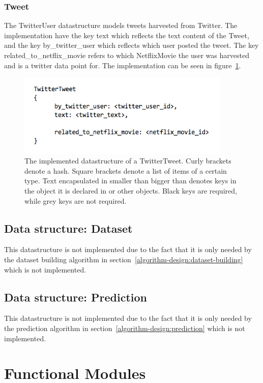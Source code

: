\subsubsection{Tweet}
The TwitterUser datastructure models tweets harvested from Twitter. The implementation have the key text which reflects the text content of the Tweet, and the key by\_twitter\_user which reflects which user posted the tweet. The key related\_to\_netflix\_movie refers to which NetflixMovie the user was harvested and is a twitter data point for. The implementation can be seen in figure~\ref{figure:datastructure-twitter-user}.

	\begin{figure}[H]
	\includegraphics[width=4in]{image/datastructure-twitter-tweet.png}
	\centering
	\caption{The implemented datastructure of a TwitterTweet. Curly brackets denote a hash. Square brackets denote a list of items of a certain type. Text encapsulated in smaller than bigger than denotes keys in the object it is declared in or other objects. Black keys are required, while grey keys are not required.}
	\label{figure:datastructure-twitter-user}
	\end{figure}

\subsection{Data structure: Dataset}
This datastructure is not implemented due to the fact that it is only needed by the dataset building algorithm in section~\ref{algorithm-design:dataset-building} which is not implemented.
\subsection{Data structure: Prediction}
This datastructure is not implemented due to the fact that it is only needed by the prediction algorithm in section~\ref{algorithm-design:prediction} which is not implemented.

\section{Functional Modules}\label{impl:Functional Modules}

